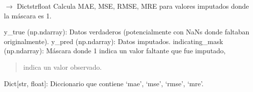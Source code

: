 \documentclass[letterpaper,10pt,english]{sphinxmanual}
\begin{document}
\begin{fulllineitems}
\label{\detokenize{pampaneira_imputation:pampaneira_imputation.evaluation.calculate_imputation_metrics}}
\pysigstartsignatures
\pysiglinewithargsret
{}
{\sphinxparamcomma {}\sphinxparamcomma {}}
{{ $\rightarrow$ Dict\DUrole{p}{{[}}strfloat\DUrole{p}{{]}}}}
\pysigstopsignatures
\sphinxAtStartPar
Calcula MAE, MSE, RMSE, MRE para valores imputados donde la máscara es 1.
\begin{description}
\sphinxAtStartPar
y\_true (np.ndarray): Datos verdaderos (potencialmente con NaNs donde faltaban originalmente).
y\_pred (np.ndarray): Datos imputados.
indicating\_mask (np.ndarray): Máscara donde 1 indica un valor faltante que fue imputado,
\begin{quote}

 indica un valor observado.
\end{quote}

\sphinxAtStartPar
Dict{[}str, float{]}: Diccionario que contiene ‘mae’, ‘mse’, ‘rmse’, ‘mre’.

\end{description}

\end{fulllineitems}

\end{document}
